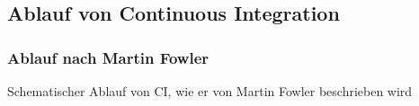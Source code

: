 \documentclass[hyperref={pdfpagelabels=false}]{beamer}
\begin{document}
\subsection{Ablauf von Continuous Integration}
\begin{frame} [t]
\frametitle{Ablauf nach Martin Fowler}
\begin{figure}[h]
  \centering
\end{figure}
\vspace{0.5cm} 
Schematischer Ablauf von CI, wie er von Martin Fowler beschrieben wird
\end{frame}
\end{document}
